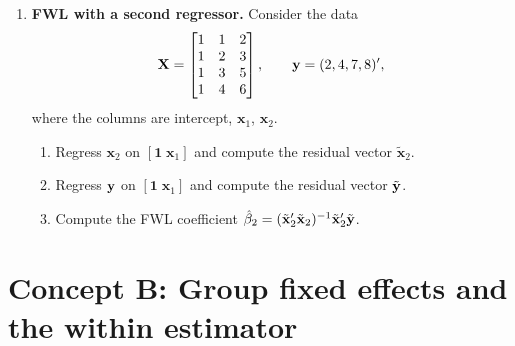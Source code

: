 \documentclass{article}
\begin{document}
\begin{enumerate}[label=\textbf{A.\arabic*},leftmargin=*,itemsep=10pt]
\item  \textbf{FWL with a second regressor.}  Consider the data
$${\mathbf X} = \begin{bmatrix}1 & 1 & 2\\ 1 & 2 & 3\\ 1 & 3 & 5\\ 1 & 4 & 6\end{bmatrix},\qquad {\mathbf y} = (2, 4, 7, 8)',$$
where the columns are intercept, $\bm x_1$, $\bm x_2$.
\begin{enumerate}[label=(\alph*)]
  \item Regress $\bm x_2$ on $[\bm 1\;\bm x_1]$ and compute the residual vector $\tilde{\bm x}_2$.
  \item Regress ${\mathbf y}$ on $[\bm 1\;\bm x_1]$ and compute the residual vector $\tilde{{\mathbf y}}$.
  \item Compute the FWL coefficient $\hat\beta_2 = (\tilde{\mathbf x}_2'\tilde{\mathbf x}_2)^{-1}\tilde{\mathbf x}_2'\tilde{{\mathbf y}}$.
\end{enumerate}

\end{enumerate}

\bigskip

\section*{Concept B: Group fixed effects and the within estimator}
\end{document}
